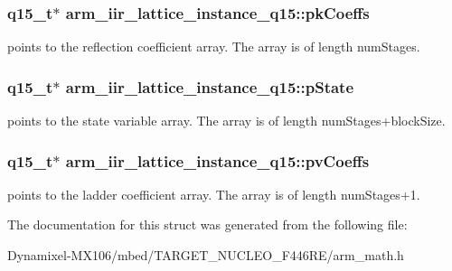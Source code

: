 \subsubsection[{\texorpdfstring{pk\+Coeffs}{pkCoeffs}}]{\setlength{\rightskip}{0pt plus 5cm}q15\+\_\+t$\ast$ arm\+\_\+iir\+\_\+lattice\+\_\+instance\+\_\+q15\+::pk\+Coeffs}\hypertarget{structarm__iir__lattice__instance__q15_a41c214a1ec38d4a82fae8899d715dd29}{}\label{structarm__iir__lattice__instance__q15_a41c214a1ec38d4a82fae8899d715dd29}
points to the reflection coefficient array. The array is of length num\+Stages. 
\subsubsection[{\texorpdfstring{p\+State}{pState}}]{\setlength{\rightskip}{0pt plus 5cm}q15\+\_\+t$\ast$ arm\+\_\+iir\+\_\+lattice\+\_\+instance\+\_\+q15\+::p\+State}\hypertarget{structarm__iir__lattice__instance__q15_afd0136ab917b529554d93f41a5e04618}{}\label{structarm__iir__lattice__instance__q15_afd0136ab917b529554d93f41a5e04618}
points to the state variable array. The array is of length num\+Stages+block\+Size. 
\subsubsection[{\texorpdfstring{pv\+Coeffs}{pvCoeffs}}]{\setlength{\rightskip}{0pt plus 5cm}q15\+\_\+t$\ast$ arm\+\_\+iir\+\_\+lattice\+\_\+instance\+\_\+q15\+::pv\+Coeffs}\hypertarget{structarm__iir__lattice__instance__q15_a4c4f57f45b223abbe2a9fb727bd2cad9}{}\label{structarm__iir__lattice__instance__q15_a4c4f57f45b223abbe2a9fb727bd2cad9}
points to the ladder coefficient array. The array is of length num\+Stages+1. 

The documentation for this struct was generated from the following file\+:\begin{DoxyCompactItemize}
\item 
Dynamixel-\/\+M\+X106/mbed/\+T\+A\+R\+G\+E\+T\+\_\+\+N\+U\+C\+L\+E\+O\+\_\+\+F446\+R\+E/arm\+\_\+math.\+h\end{DoxyCompactItemize}
